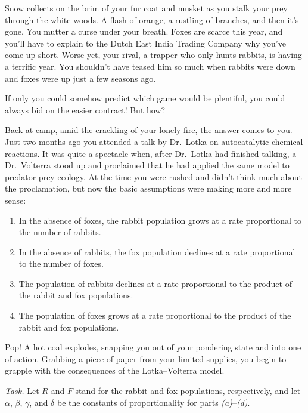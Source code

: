 \begin{emphbox}[]
		Snow collects on the brim of your fur coat and musket 
		as you stalk your prey through the white woods.  A flash 
		of orange, a rustling of branches, and then it's
		gone.
		You mutter a curse under your breath.  Foxes are scarce this year, 
		and you'll have to explain to the Dutch East India Trading Company 
		why you've come up short.  Worse yet, your rival, a
		trapper who only hunts 
		rabbits, is having a terrific year.  You shouldn't have teased him so 
		much when rabbits were down and foxes were up just a few seasons ago.

		If only you could somehow predict which game would be plentiful, you could always bid on the easier contract!  But how?

		Back at camp, amid the crackling of your lonely fire, the answer comes to you.  Just two months ago you attended a talk by Dr.~\!Lotka on autocatalytic chemical reactions.  It was quite a spectacle when, after Dr.~\!Lotka had finished talking, a Dr.~\!Volterra stood up and proclaimed 	that he had applied the same model to predator-prey ecology. At the time you were rushed and didn't think much about the proclamation, but now the 	basic assumptions were making more and more sense:

		\begin{enumerate}[label=\emph{(\alph*)}]
			\item In the absence of foxes, the rabbit population grows
				at a rate proportional to the number of rabbits.
			\item In the absence of rabbits, the fox population declines
				at a rate proportional to the number of foxes.
			\item The population of rabbits declines at a rate proportional
				to the product of the rabbit and fox populations.
			\item The population of foxes grows at a rate proportional 
				to the product of the rabbit and fox populations.
		\end{enumerate}

		Pop! A hot coal explodes, snapping you out of your pondering state
		and into one of action.  Grabbing a piece of paper from your limited
		supplies, you begin to grapple with the consequences of the
		Lotka--Volterra model.
\end{emphbox}

\emph{Task.} 
	Let $R$ and $F$ stand for the rabbit and fox populations, respectively, and
	let $\alpha$, $\beta$, $\gamma$, and $\delta$ be the constants of proportionality for
	parts \emph{(a)}--\emph{(d)}.

